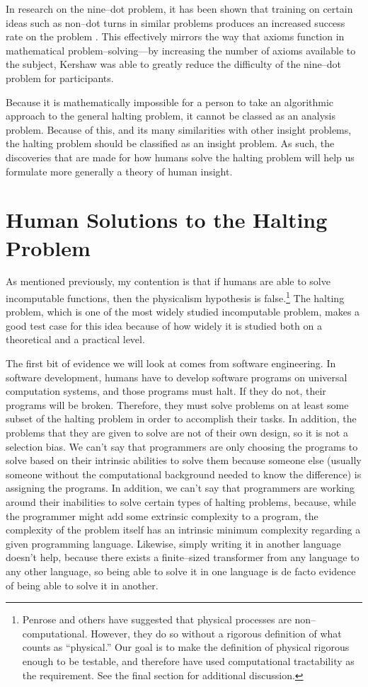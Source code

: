 In research on the nine--dot problem, it has been shown that training on certain ideas such as non--dot turns in similar problems produces an increased success rate on the problem \citep{kershawandohlsson2001, kershaw2004}.  This effectively mirrors the way that axioms function in mathematical problem--solving---by increasing the number of axioms available to the subject, Kershaw was able to greatly reduce the difficulty of the nine--dot problem for participants.

Because it is mathematically impossible for a person to take an algorithmic approach to the general halting problem, it cannot be classed as an analysis problem.  Because of this, and its many similarities with other insight problems, the halting problem should be classified as an insight problem.  As such, the discoveries that are made for how humans solve the halting problem will help us formulate more generally a theory of human insight.

\section{Human Solutions to the Halting Problem}

As mentioned previously, my contention is that if humans are able to solve incomputable functions, then the physicalism hypothesis is false.\footnote{Penrose and others have suggested that physical processes are non--computational.  However, they do so without a rigorous definition of what counts as ``physical.''  Our goal is to make the definition of physical rigorous enough to be testable, and therefore have used computational tractability as the requirement.  See the final section for additional discussion.}  The halting problem, which is one of the most widely studied incomputable problem, makes a good test case for this idea because of how widely it is studied both on a theoretical and a practical level.

The first bit of evidence we will look at comes from software engineering.  In software development, humans have to develop software programs on universal computation systems, and those programs must halt.  If they do not, their programs will be broken.  Therefore, they must solve problems on at least some subset of the halting problem in order to accomplish their tasks.  In addition, the problems that they are given to solve are not of their own design, so it is not a selection bias.  We can't say that programmers are only choosing the programs to solve based on their intrinsic abilities to solve them because someone else (usually someone without the computational background needed to know the difference) is assigning the programs.  In addition, we can't say that programmers are working around their inabilities to solve certain types of halting problems, because, while the programmer might add some extrinsic complexity to a program, the complexity of the problem itself has an intrinsic minimum complexity regarding a given programming language.  Likewise, simply writing it in another language doesn't help, because there exists a finite--sized transformer from any language to any other language, so being able to solve it in one language is de facto evidence of being able to solve it in another.

